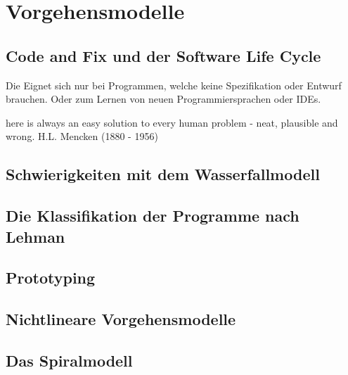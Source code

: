 \documentclass[a4paper]{article}
\title{\docTitle}
\author{Moritz}
\date{\today}
\begin{document}
\maketitle
\tableofcontents


\section{Vorgehensmodelle}

\subsection{Code and Fix und der Software Life Cycle}

Die Eignet sich nur bei Programmen, welche keine Spezifikation oder Entwurf brauchen. Oder zum Lernen von neuen Programmiersprachen oder IDEs.

here is always an easy solution to every human problem - neat, plausible and wrong. H.L. Mencken (1880 - 1956)


\subsection{Schwierigkeiten mit dem Wasserfallmodell}

\subsection{Die Klassifikation der Programme nach Lehman}

\subsection{Prototyping}

\subsection{Nichtlineare Vorgehensmodelle}

\subsection{Das Spiralmodell}

\end{document}
